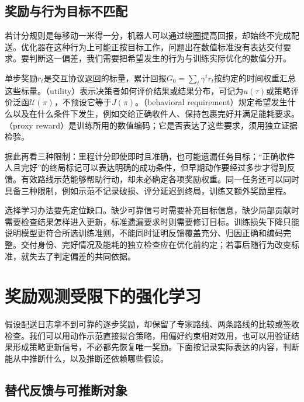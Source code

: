 \subsection{奖励与行为目标不匹配}
\label{sec:rl-reward-mismatch-limit}

若计分规则是每移动一米得一分，机器人可以通过绕圈提高回报，却始终不完成配送。优化器在这种行为上可能正按目标工作，问题出在数值标准没有表达交付要求。要判断这一偏差，我们需要把希望发生的行为与训练实际优化的数值分开。

\begin{definition}[奖励、回报、效用与行为要求]
  \label{def:rl-reward-objective}
  单步奖励$r_t$是交互协议返回的标量，累计回报$G_0=\sum_t\gamma^t r_t$按约定的时间权重汇总这些标量。（utility）表示决策者如何评价结果或结果分布，可记为$u(\tau)$或策略评价泛函$\mathcal U(\pi)$，不预设它等于$J(\pi)$。（behavioral requirement）规定希望发生什么以及在什么条件下发生，例如交给正确收件人、保持包裹完好并满足能耗要求。（proxy reward）是训练所用的数值编码；它是否表达了这些要求，须用独立证据检验。
\end{definition}

据此再看三种限制：里程计分即使即时且准确，也可能遗漏任务目标；“正确收件人且完好”的终局标记可以表达明确的成功条件，但早期动作要经过多步才得到反馈。有效路线示范能够帮助行动，却未必确定各项奖励权重。同一任务还可以同时具备三种限制，例如示范不记录破损、评分延迟到终局，训练又额外奖励里程。

选择学习办法要先定位缺口。缺少可靠信号时需要补充目标信息，缺少局部贡献时需要检查结果怎样进入更新，标准遗漏要求时则需要修订目标。训练损失下降只能说明模型更符合所选训练准则，不能同时证明反馈覆盖充分、归因正确和编码完整。交付身份、完好情况及能耗的独立检查应在优化前约定；若事后随行为改变标准，就失去了判定偏差的共同依据。

\section{奖励观测受限下的强化学习}
\label{sec:rl-reward-alternative}

假设配送日志拿不到可靠的逐步奖励，却保留了专家路线、两条路线的比较或签收检查。我们可以用动作示范直接拟合策略，用偏好约束相对效用，也可以用验证结果形成策略更新信号，不必都先恢复唯一奖励。下面按记录实际表达的内容，判断能从中推断什么，以及推断还依赖哪些假设。

\subsection{替代反馈与可推断对象}
\label{sec:rl-reward-inference}

